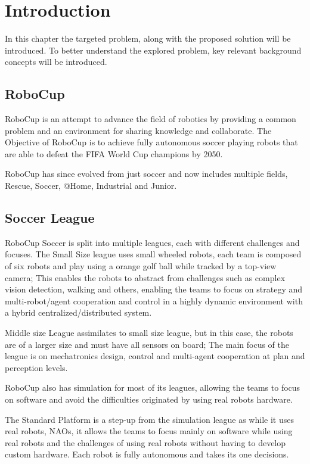 \chapter{Introduction}
In this chapter the targeted problem, along with the proposed solution will be introduced. To better understand the explored problem, 
key relevant background concepts will be introduced.

    \section{RoboCup}
    RoboCup is an attempt to advance the field of robotics by providing a common problem and an environment for sharing knowledge and collaborate.
    The Objective of RoboCup is to achieve fully autonomous soccer playing robots that are able to defeat the FIFA World Cup champions by 2050. 

    RoboCup has since evolved from just soccer and now includes multiple fields, Rescue, Soccer, @Home, Industrial and Junior.
    \cite{RoboCup}

    \section{Soccer League}
    RoboCup Soccer is split into multiple leagues, each with different challenges and focuses. The Small Size league uses small wheeled robots, 
    each team is composed of six robots and play using a orange golf ball while tracked by a top-view camera;
    This enables the robots to abstract from challenges such as complex vision detection, 
    walking and others, enabling the teams to focus on strategy and multi-robot/agent cooperation and 
    control in a highly dynamic environment with a hybrid centralized/distributed system. 

    Middle size League assimilates to small size league, but in this case, the robots are of a larger size and must have all sensors on board; 
    The main focus of the league is on mechatronics design, control and multi-agent cooperation at plan and perception levels.

    RoboCup also has simulation for most of its leagues, allowing the teams to focus on software and avoid the difficulties originated by using real robots hardware.

    The Standard Platform is a step-up from the simulation league as while it uses real robots, NAOs, it allows the teams to focus mainly on software while using real robots and the challenges of using real robots without having to develop custom hardware. Each robot is fully autonomous and takes its one decisions.

